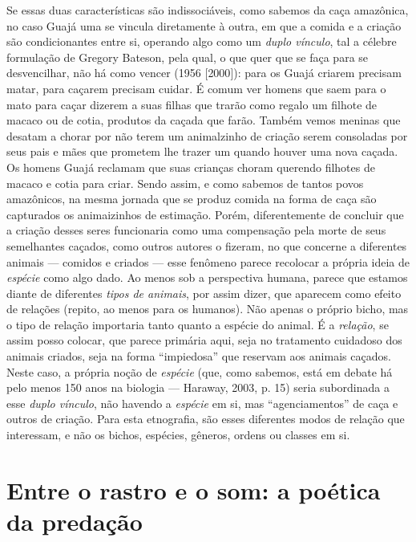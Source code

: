 Se essas duas características são indissociáveis, como sabemos da caça
amazônica, no caso Guajá uma se vincula diretamente à outra, em que a
comida e a criação são condicionantes entre si, operando algo como um
\emph{duplo vínculo}, tal a célebre formulação de Gregory Bateson, pela
qual, o que quer que se faça para se desvencilhar, não há como vencer
(1956 {[}2000{]}): para os Guajá criarem precisam matar, para caçarem
precisam cuidar. É comum ver homens que saem para o mato para caçar
dizerem a suas filhas que trarão como regalo um filhote de macaco ou de
cotia, produtos da caçada que farão. Também vemos meninas que desatam a
chorar por não terem um animalzinho de criação serem consoladas por seus
pais e mães que prometem lhe trazer um quando houver uma nova caçada. Os
homens Guajá reclamam que suas crianças choram querendo filhotes de
macaco e cotia para criar. Sendo assim, e como sabemos de tantos povos
amazônicos, na mesma jornada que se produz comida na forma de caça são
capturados os animaizinhos de estimação. Porém, diferentemente de
concluir que a criação desses seres funcionaria como uma compensação
pela morte de seus semelhantes caçados, como outros autores o fizeram,
no que concerne a diferentes animais --- comidos e criados --- esse fenômeno
parece recolocar a própria ideia de \emph{espécie} como algo dado. Ao
menos sob a perspectiva humana, parece que estamos diante de diferentes
\emph{tipos de animais}, por assim dizer, que aparecem como efeito de
relações (repito, ao menos para os humanos). Não apenas o próprio bicho,
mas o tipo de relação importaria tanto quanto a espécie do animal. É a
\emph{relação}, se assim posso colocar, que parece primária aqui, seja
no tratamento cuidadoso dos animais criados, seja na forma ``impiedosa''
que reservam aos animais caçados. Neste caso, a própria noção de
\emph{espécie} (que, como sabemos, está em debate há pelo menos 150 anos
na biologia --- Haraway, 2003, p. 15) seria subordinada a esse \emph{duplo
vínculo}, não havendo a \emph{espécie} em si, mas ``agenciamentos'' de
caça e outros de criação. Para esta etnografia, são esses diferentes
modos de relação que interessam, e não os bichos, espécies, gêneros,
ordens ou classes em si.

\section{Entre o rastro e o som: a poética da predação}

